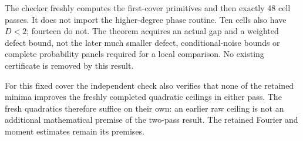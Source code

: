 The checker freshly computes the first-cover primitives and then exactly
48 cell passes. It does not import the higher-degree phase routine.
Ten cells also have $D<2$; fourteen do not. The theorem acquires an actual
gap and a weighted defect bound, not the later much smaller defect,
conditional-noise bounds or complete probability panels required for a
local comparison. No existing certificate is removed by this result.

For this fixed cover the independent check also verifies that none of the
retained minima improves the freshly completed quadratic ceilings in either
pass. The fresh quadratics therefore suffice on their own: an earlier raw
ceiling is not an additional mathematical premise of the two-pass result.
The retained Fourier and moment estimates remain its premises.
